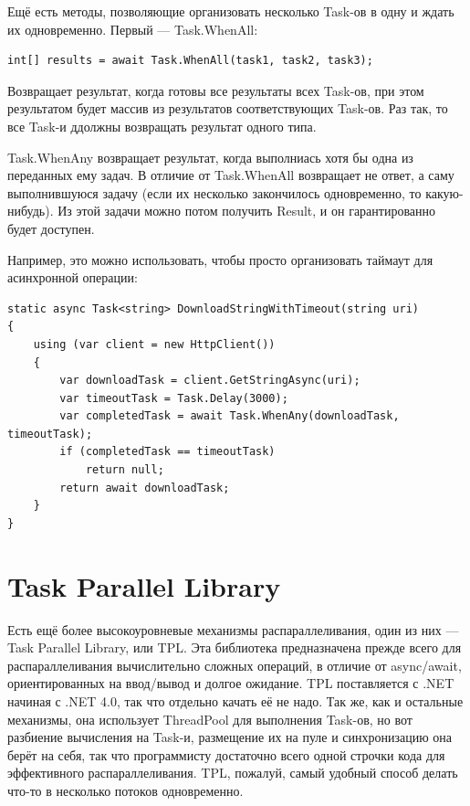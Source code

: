 \documentclass[a5paper]{article}
\begin{document}
Ещё есть методы, позволяющие организовать несколько Task-ов в одну и ждать их одновременно. Первый --- Task.WhenAll:

\begin{verbatim}
int[] results = await Task.WhenAll(task1, task2, task3);
\end{verbatim}

Возвращает результат, когда готовы все результаты всех Task-ов, при этом результатом будет массив из результатов соответствующих Task-ов. Раз так, то все Task-и ддолжны возвращать результат одного типа.

Task.WhenAny возвращает результат, когда выполниась хотя бы одна из переданных ему задач. В отличие от Task.WhenAll возвращает не ответ, а саму выполнившуюся задачу (если их несколько закончилось одновременно, то какую-нибудь). Из этой задачи можно потом получить Result, и он гарантированно будет доступен.

Например, это можно использовать, чтобы просто организовать таймаут для асинхронной операции:

\begin{verbatim}
static async Task<string> DownloadStringWithTimeout(string uri)
{
    using (var client = new HttpClient())
    {
        var downloadTask = client.GetStringAsync(uri);
        var timeoutTask = Task.Delay(3000);
        var completedTask = await Task.WhenAny(downloadTask, timeoutTask);
        if (completedTask == timeoutTask)
            return null;
        return await downloadTask;
    }
}
\end{verbatim}

\section{Task Parallel Library}

Есть ещё более высокоуровневые механизмы распараллеливания, один из них --- Task Parallel Library, или TPL. Эта библиотека предназначена прежде всего для распараллеливания вычислительно сложных операций, в отличие от async/await, ориентированных на ввод/вывод и долгое ожидание. TPL поставляется с .NET начиная с .NET 4.0, так что отдельно качать её не надо. Так же, как и остальные механизмы, она использует ThreadPool для выполнения Task-ов, но вот разбиение вычисления на Task-и, размещение их на пуле и синхронизацию она берёт на себя, так что программисту достаточно всего одной строчки кода для эффективного распараллеливания. TPL, пожалуй, самый удобный способ делать что-то в несколько потоков одновременно.
\end{document}
